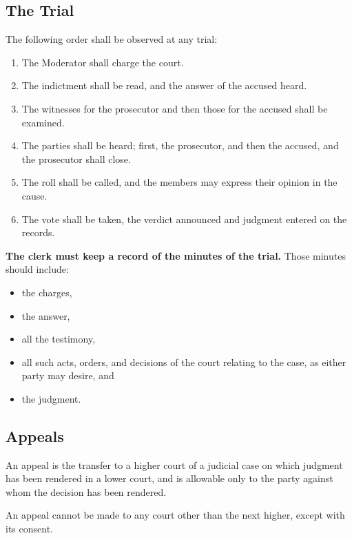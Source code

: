 \documentclass[
]{book}
\providecommand{\tightlist}{%
  \setlength{\itemsep}{0pt}\setlength{\parskip}{0pt}}
\begin{document}
\hypertarget{the-trial}{%
\subsection{The Trial}\label{the-trial}}

The following order shall be observed at any trial:

\begin{enumerate}
\def\labelenumi{\arabic{enumi}.}
\tightlist
\item
  The Moderator shall charge the court.
\item
  The indictment shall be read, and the answer of the accused heard.
\item
  The witnesses for the prosecutor and then those for the accused shall be examined.
\item
  The parties shall be heard; first, the prosecutor, and then the accused, and the prosecutor shall close.
\item
  The roll shall be called, and the members may express their opinion in the cause.
\item
  The vote shall be taken, the verdict announced and judgment entered on the records.
\end{enumerate}

\textbf{The clerk must keep a record of the minutes of the trial.} Those minutes should include:

\begin{itemize}
\tightlist
\item
  the charges,
\item
  the answer,
\item
  all the testimony,
\item
  all such acts, orders, and decisions of the court relating to the case, as either party may desire, and
\item
  the judgment.
\end{itemize}

\hypertarget{appeals}{%
\subsection{Appeals}\label{appeals}}

An appeal is the transfer to a higher court of a judicial case on which judgment has been rendered in a lower court, and is allowable only to the party against whom the decision has been rendered.

An appeal cannot be made to any court other than the next higher, except with its consent.
\end{document}
